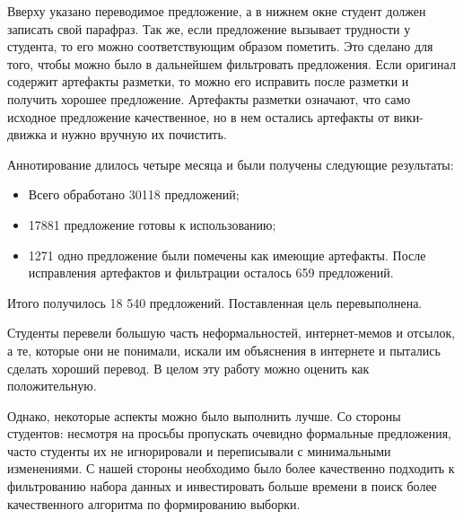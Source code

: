 Вверху указано переводимое предложение, а в нижнем окне студент должен записать свой парафраз.
Так же, если предложение вызывает трудности у студента, то его можно соответствующим образом пометить.
Это сделано для того, чтобы можно было в дальнейшем фильтровать предложения.
Если оригинал содержит артефакты разметки, то можно его исправить после разметки и получить хорошее предложение. Артефакты разметки означают, что само исходное предложение качественное, но в нем остались артефакты от вики-движка и нужно вручную их почистить.


Аннотирование длилось четыре месяца и были получены следующие результаты:
\begin{itemize}
    \item Всего обработано 30118 предложений;
    \item 17881 предложение готовы к использованию;
    \item 1271 одно предложение были помечены как имеющие артефакты. После исправления артефактов и фильтрации осталось 659 предложений.
\end{itemize}
Итого получилось 18 540 предложений. Поставленная цель перевыполнена.

Студенты перевели большую часть неформальностей, интернет-мемов и отсылок, а те, которые они не понимали, искали им объяснения в интернете и пытались сделать хороший перевод.
В целом эту работу можно оценить как положительную.


Однако, некоторые аспекты можно было выполнить лучше.
Со стороны студентов: несмотря на просьбы пропускать очевидно формальные предложения, часто студенты их не игнорировали и переписывали с минимальными изменениями.
С нашей стороны необходимо было более качественно подходить к фильтрованию набора данных и инвестировать больше времени в поиск более качественного алгоритма по формированию выборки.
